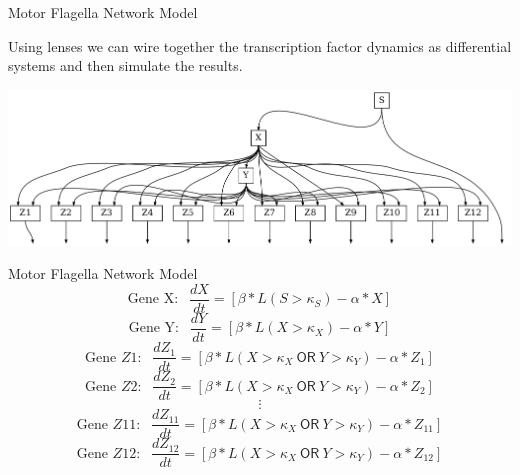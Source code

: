 \documentclass{beamer}
\begin{document}
\begin{frame}{Motor Flagella Network Model}
    \begin{large}
        Using lenses we can wire together the transcription factor dynamics as differential systems and then simulate the results.

    \end{large}

    \begin{center}
        \includegraphics[scale=0.35]{motor_flagella_network.png}
    \end{center}

\end{frame}


\begin{frame}{Motor Flagella Network Model}
    $$\text{Gene X: } \ \ \frac{dX}{dt} = [\beta*L(S > \kappa_S) - \alpha * X]$$
    $$\text{Gene Y: } \ \ \frac{dY}{dt} = [\beta*L(X > \kappa_X) - \alpha * Y]$$
    $$\text{Gene $Z1$: } \ \ \frac{dZ_1}{dt} = [\beta*L(X > \kappa_X \ \mathsf{OR} \ Y > \kappa_Y) - \alpha * Z_1]$$
    $$\text{Gene $Z2$: } \ \ \frac{dZ_2}{dt} = [\beta*L(X > \kappa_X \ \mathsf{OR} \ Y > \kappa_Y) - \alpha * Z_2]$$
    $$\vdots$$
    $$\text{Gene $Z11$: } \ \ \frac{dZ_{11}}{dt} = [\beta*L(X > \kappa_X \ \mathsf{OR} \ Y > \kappa_Y) - \alpha * Z_{11}]$$
    $$\text{Gene $Z12$: } \ \ \frac{dZ_{12}}{dt} = [\beta*L(X > \kappa_X \ \mathsf{OR} \ Y > \kappa_Y) - \alpha * Z_{12}]$$

\end{frame}
\end{document}
